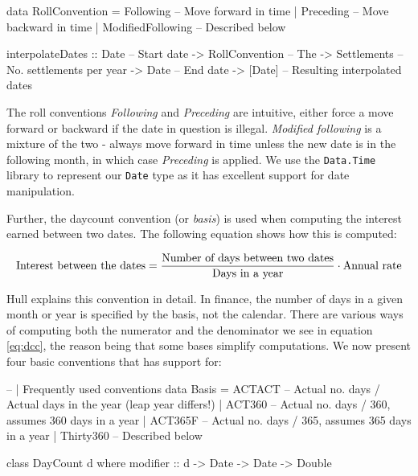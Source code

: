 \begin{hscode}
data RollConvention = Following -- Move forward in time 
                    | Preceding -- Move backward in time
                    | ModifiedFollowing -- Described below

interpolateDates :: Date           -- Start date
                 -> RollConvention -- The 
                 -> Settlements    -- No. settlements per year
                 -> Date           -- End date
                 -> [Date]         -- Resulting interpolated dates
\end{hscode}

The roll conventions \emph{Following} and \emph{Preceding} are intuitive, either
force a move forward or backward if the date in question is illegal. 
\emph{Modified following} is a mixture of the two - always move forward in time
unless the new date is in the following month, in which case \emph{Preceding}
is applied.
We use the \texttt{Data.Time} library to represent our \texttt{Date} type
as it has excellent support for date manipulation.\\


Further, the daycount convention (or \emph{basis}) is used when computing the
interest earned between two dates. The following equation shows how this is
computed:

\begin{equation}\label{eq:dcc}
\text{Interest between the dates} = \\
\frac{\text{Number of days between two dates}}{\text{Days in a year}} \cdot \text{Annual rate}
\end{equation}

Hull\cite{HULL} explains this convention in detail.
In finance, the number of days in a given month or year is specified by the
basis, not the calendar. There are various ways of computing both the numerator
and the denominator we see in equation \ref{eq:dcc}, the reason being that some
bases simplify computations. We now present four basic conventions that \hql
has support for:

\begin{hscode}
-- | Frequently used conventions 
data Basis = ACTACT -- Actual no. days / Actual days in the year (leap year differs!)
           | ACT360    -- Actual no. days / 360, assumes 360 days in a year
           | ACT365F   -- Actual no. days / 365, assumes 365 days in a year
           | Thirty360 -- Described below

class DayCount d where
  modifier :: d -> Date -> Date -> Double
\end{hscode}

